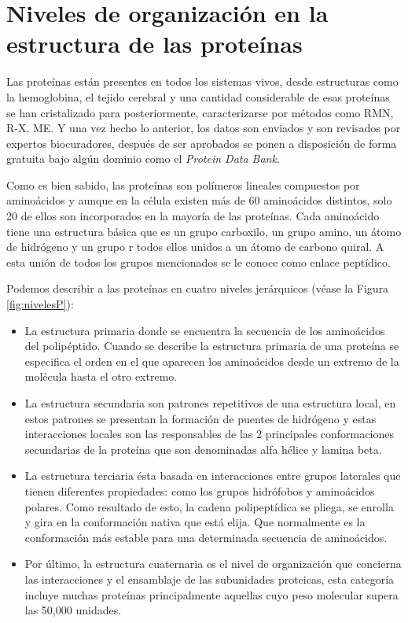  
 
\section{Niveles de organizaci\'{o}n en la estructura de las prote\'{i}nas}


Las prote\'{i}nas est\'{a}n presentes en todos los sistemas vivos, desde estructuras como la hemoglobina, el tejido cerebral y una cantidad considerable de esas prote\'{i}nas se han cristalizado para
posteriormente, caracterizarse por m\'{e}todos como RMN, R-X, ME. Y una vez hecho lo anterior, los datos son enviados y son revisados por expertos biocuradores, despu\'{e}s de
ser aprobados se ponen a disposici\'{o}n de forma gratuita bajo algún dominio como el \textit{Protein Data Bank}.


Como es bien sabido, las prote\'{i}nas son pol\'{i}meros lineales compuestos por amino\'{a}cidos y aunque en la
c\'{e}lula existen m\'{a}s de 60 amino\'{a}cidos distintos, solo 20 de ellos son incorporados en la mayor\'{i}a de las
prote\'{i}nas.
Cada amino\'{a}cido tiene una estructura b\'{a}sica que es un grupo carboxilo, un grupo amino, un \'{a}tomo de
hidr\'{o}geno y un grupo r todos ellos unidos a un \'{a}tomo de carbono quiral. A esta uni\'{o}n de todos los grupos
mencionados se le conoce como enlace pept\'{i}dico.

Podemos describir a las prote\'{i}nas en cuatro niveles jer\'{a}rquicos (véase la Figura \ref{fig:nivelesP}):

\begin{itemize}

\item La estructura primaria donde se encuentra la secuencia de los
amino\'{a}cidos del polip\'{e}ptido. Cuando se describe la estructura primaria de una prote\'{i}na se especiﬁca el
orden en el que aparecen los amino\'{a}cidos desde un extremo de la mol\'{e}cula hasta el otro extremo.

\item La estructura secundaria son patrones repetitivos de una estructura local, en estos
patrones se presentan la formaci\'{o}n de puentes de hidr\'{o}geno y estas interacciones locales son las
responsables de las 2 principales conformaciones secundarias de la prote\'{i}na que son denominadas alfa
h\'{e}lice y lamina beta.


\item La estructura terciaria \'{e}sta basada en interacciones entre grupos laterales que tienen diferentes
propiedades: como los grupos hidr\'{o}fobos y amino\'{a}cidos polares. Como resultado de esto, la cadena
polipept\'{i}dica se pliega, se enrolla y gira en la conformaci\'{o}n nativa que est\'{a} elija. Que normalmente es la
conformaci\'{o}n m\'{a}s estable para una determinada secuencia de amino\'{a}cidos.


\item Por último, la estructura cuaternaria es el nivel de organizaci\'{o}n que concierna las interacciones y el ensamblaje de las subunidades proteicas, esta categor\'{i}a incluye muchas prote\'{i}nas principalmente aquellas cuyo peso molecular supera las 50,000 unidades.

\end{itemize}

